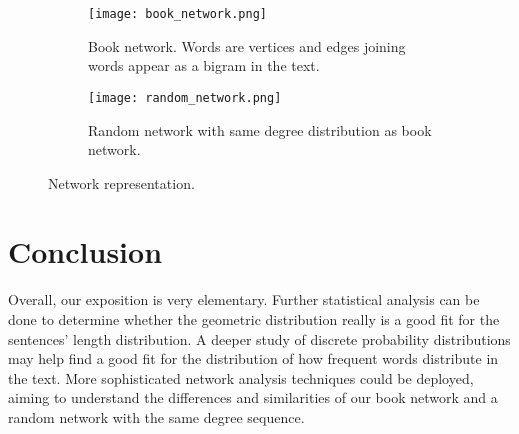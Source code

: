 \documentclass[letterpaper, 10 pt, conference]{article}
\begin{document}
\begin{figure}
	\centering
	\begin{subfigure}{0.45\linewidth}
		\texttt{[image: book\_network.png]}
		\caption{Book network. Words are vertices and edges joining words appear as a bigram in the text.}
		\label{fig:book-network}
	\end{subfigure}
	\hfill
	\begin{subfigure}{0.45\linewidth}
		\texttt{[image: random\_network.png]}
		\label{fig:random-network}
		\caption{Random network with same degree distribution as book network.}
	\end{subfigure}
   	\caption{Network representation.} 
	\label{fig:network}
\end{figure}


\section{Conclusion}
Overall, our exposition is very elementary. Further statistical analysis can be done to determine whether the geometric distribution really is a good fit for the sentences' length distribution. A deeper study of discrete probability distributions may help find a good fit for the distribution of how frequent words distribute in the text. More sophisticated network analysis techniques could be deployed, aiming to understand the differences and similarities of our book network and a random network with the same degree sequence.






\end{document}
